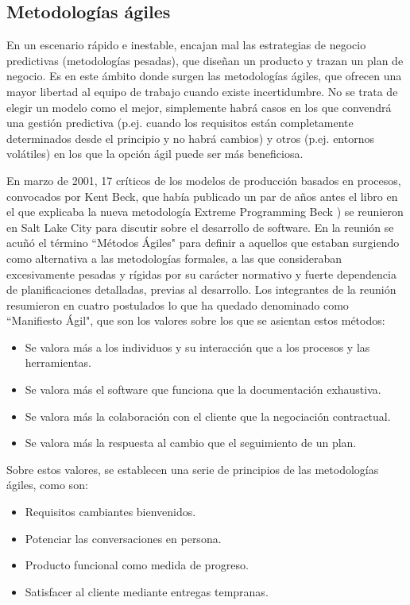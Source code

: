 \subsection{Metodologías ágiles}
En un escenario rápido e inestable, encajan mal las estrategias de negocio predictivas (metodologías pesadas), que diseñan un producto y trazan un plan de negocio. Es en este ámbito donde surgen las metodologías ágiles, que ofrecen una mayor libertad al equipo de trabajo cuando existe incertidumbre. No se trata de elegir un modelo como el mejor, simplemente habrá casos en los que convendrá una gestión predictiva (p.ej. cuando los requisitos están completamente determinados desde el principio y no habrá cambios) y otros (p.ej. entornos volátiles) en los que la opción ágil puede ser más beneficiosa.

En marzo de 2001, 17 críticos de los modelos de producción basados en procesos, convocados por Kent Beck, que había publicado un par de años antes el libro en el que explicaba la nueva metodología Extreme Programming Beck \cite{kent}) se reunieron en Salt Lake City para discutir sobre el desarrollo de software. En la reunión se acuñó el término ``Métodos Ágiles" para definir a aquellos que estaban surgiendo como alternativa a las metodologías formales, a las que consideraban excesivamente pesadas y rígidas por su carácter normativo y fuerte dependencia de planificaciones detalladas, previas al desarrollo. Los integrantes de la reunión resumieron en cuatro postulados lo que ha quedado denominado como ``Manifiesto Ágil", que son los valores sobre los que se asientan estos métodos:

\begin{itemize}
\item Se valora más a los individuos y su interacción que a los procesos y las herramientas.
\item Se valora más el software que funciona que la documentación exhaustiva.
\item Se valora más la colaboración con el cliente que la negociación contractual.
\item Se valora más la respuesta al cambio que el seguimiento de un plan.
\end{itemize}

\noindent
Sobre estos valores, se establecen una serie de principios de las metodologías ágiles, como son:

\begin{itemize}
\item Requisitos cambiantes bienvenidos.
\item Potenciar las conversaciones en persona.
\item Producto funcional como medida de progreso.
\item Satisfacer al cliente mediante entregas tempranas.
\end{itemize}


